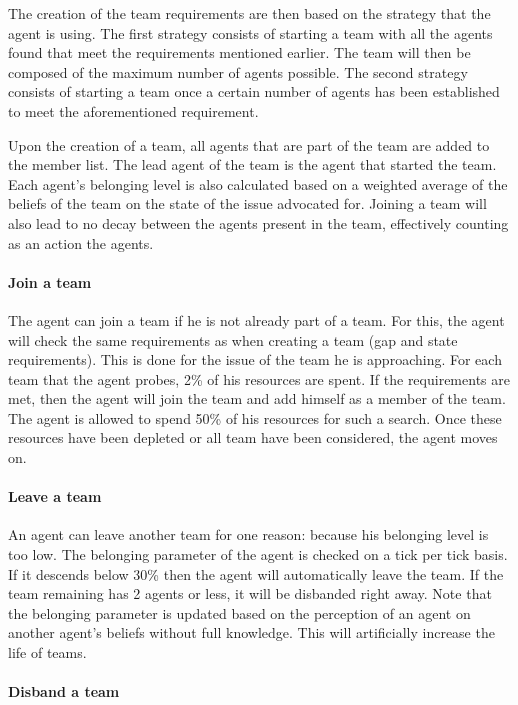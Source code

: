 The creation of the team requirements are then based on the strategy that the agent is using. The first strategy consists of starting a team with all the agents found that meet the requirements mentioned earlier. The team will then be composed of the maximum number of agents possible. The second strategy consists of starting a team once a certain number of agents has been established to meet the aforementioned requirement.

Upon the creation of a team, all agents that are part of the team are added to the member list. The lead agent of the team is the agent that started the team. Each agent's belonging level is also calculated based on a weighted average of the beliefs of the team on the state of the issue advocated for. Joining a team will also lead to no decay between the agents present in the team, effectively counting as an action the agents.

\paragraph{Join a team}

The agent can join a team if he is not already part of a team. For this, the agent will check the same requirements as when creating a team (gap and state requirements). This is done for the issue of the team he is approaching. For each team that the agent probes, 2\% of his resources are spent. If the requirements are met, then the agent will join the team and add himself as a member of the team. The agent is allowed to spend 50\% of his resources for such a search. Once these resources have been depleted or all team have been considered, the agent moves on.

\paragraph{Leave a team}

An agent can leave another team for one reason: because his belonging level is too low. The belonging parameter of the agent is checked on a tick per tick basis. If it descends below 30\% then the agent will automatically leave the team. If the team remaining has 2 agents or less, it will be disbanded right away. Note that the belonging parameter is updated based on the perception of an agent on another agent's beliefs without full knowledge. This will artificially increase the life of teams. 

\paragraph{Disband a team}

